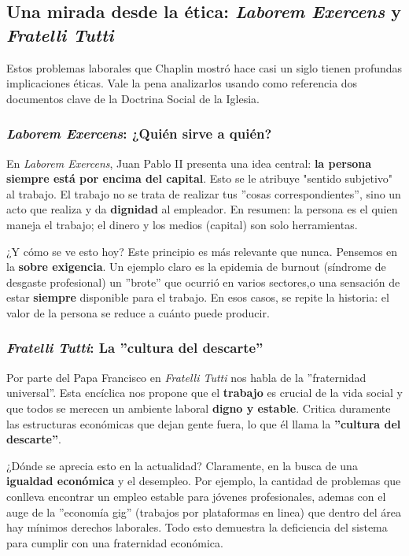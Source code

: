 \documentclass[a4paper,12pt]{article}
\begin{document}
\subsection{Una mirada desde la ética: \textit{Laborem Exercens} y \textit{Fratelli Tutti}}

Estos problemas laborales que Chaplin mostró hace casi un siglo tienen profundas implicaciones éticas. Vale la pena analizarlos usando como referencia dos documentos clave de la Doctrina Social de la Iglesia.

\subsubsection*{\textit{Laborem Exercens}: ¿Quién sirve a quién?}

En \textit{Laborem Exercens}, Juan Pablo II presenta una idea central: \textbf{la persona siempre está por encima del capital}. Esto se le atribuye "sentido subjetivo" al trabajo. El trabajo no se trata de realizar tus ''cosas correspondientes'', sino un acto que realiza y da \textbf{dignidad} al empleador. En resumen: la persona es el quien maneja el trabajo; el dinero y los medios (capital) son solo herramientas.
\vspace{3mm}

¿Y cómo se ve esto hoy? Este principio es más relevante que nunca. Pensemos en la \textbf{sobre exigencia}. Un ejemplo claro es la epidemia de burnout (síndrome de desgaste profesional) un ''brote'' que ocurrió en varios sectores,o una sensación de estar \textbf{siempre} disponible para el trabajo. En esos casos, se repite la historia: el valor de la persona se reduce a cuánto puede producir.

\subsubsection*{\textit{Fratelli Tutti}: La ''cultura del descarte''}

Por parte del Papa Francisco en \textit{Fratelli Tutti} nos habla de la ''fraternidad universal''. Esta encíclica nos propone que el \textbf{trabajo} es crucial de la vida social y que todos se merecen un ambiente laboral \textbf{digno y estable}. Critica duramente las estructuras económicas que dejan gente fuera, lo que él llama la \textbf{''cultura del descarte''}.
\vspace{3mm}

¿Dónde se aprecia esto en la actualidad? Claramente, en la busca de una \textbf{igualdad económica} y el desempleo. Por ejemplo, la cantidad de problemas que conlleva encontrar un empleo estable para jóvenes profesionales, ademas con el auge de la ''economía gig'' (trabajos por plataformas en linea) que dentro del área hay mínimos derechos laborales. Todo esto demuestra la deficiencia del sistema para cumplir con una fraternidad económica.
\vspace{3mm}
\end{document}

